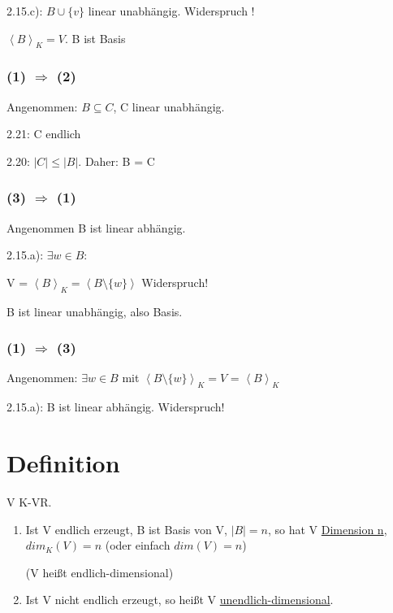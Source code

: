 \documentclass[a4paper, openany]{book}
\begin{document}
    2.15.c): $B \cup \{v\}$ linear unabhängig. Widerspruch !

    $\left \langle B \right \rangle_K = V.$ B ist Basis

    \subsubsection*{(1) $\Rightarrow$ (2)}

    Angenommen: $B \subseteq C$, C linear unabhängig.

    2.21: C endlich

    2.20: $|C| \le |B|$. Daher: B = C

    \subsubsection*{(3) $\Rightarrow$ (1)} 

    Angenommen B ist linear abhängig.

    2.15.a): $\exists w \in B$:

    V = $\left \langle B \right \rangle_K = \left \langle B \setminus \{w\} \right \rangle$ Widerspruch!

    B ist linear unabhängig, also Basis.

    \subsubsection*{(1) $\Rightarrow$ (3)}

    Angenommen: $\exists w \in B$ mit $\left \langle B \setminus \{w\} \right \rangle_K = V$ = $\left \langle B \right \rangle_K$

    2.15.a): B ist linear abhängig. Widerspruch!

    \section{Definition}

    V K-VR.

    \begin{enumerate}[label=(\alph*)]
      \item Ist V endlich erzeugt, B ist Basis von V, $|B| = n$, so hat V \underline{Dimension n}, $dim_K(V) = n$ (oder einfach $dim(V) = n$)

      (V heißt endlich-dimensional)

      \item Ist V nicht endlich erzeugt, so heißt V \underline{unendlich-dimensional}.
    \end{enumerate}
\end{document}
